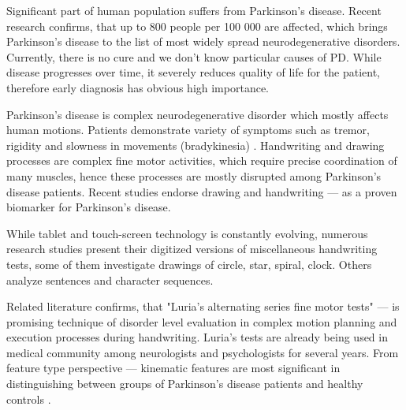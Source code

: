 \begin{comment}



\end{comment}


Significant part of human population suffers from  Parkinson's disease. Recent research confirms, that up to 800 people per 100 000 are affected, which brings Parkinson's disease to the list of most widely spread neurodegenerative disorders. Currently, there is no cure and we don't know particular causes of PD. While disease progresses over time, it severely reduces quality of life for the patient, therefore early diagnosis has obvious high importance. 

Parkinson's disease is complex neurodegenerative disorder which mostly affects human motions. Patients demonstrate variety of symptoms such as tremor, rigidity and slowness in movements (bradykinesia) \cite{moustafa2016motor, smits2014standardized, shukla2012micrographia, drotar2016evaluation}. Handwriting and drawing processes are complex fine motor activities, which require precise coordination of many muscles, hence these processes are mostly disrupted among Parkinson's disease patients. Recent studies \cite{nackaerts2017validity, letanneux2014micrographia, drotar2015decision} endorse drawing and handwriting --- as a proven biomarker for Parkinson's disease. 

While tablet and touch-screen technology is constantly evolving, numerous research studies present their digitized versions of miscellaneous handwriting tests, some of them investigate drawings of circle, star, spiral, clock. Others analyze sentences and character sequences.

Related literature \cite{golden1978diagnostic, nomm2016quantitative} confirms, that "Luria's alternating series fine motor tests" --- is promising technique of disorder level evaluation in complex motion planning and execution processes during handwriting. Luria's tests are already being used in medical community among neurologists and psychologists for several years. From feature type perspective --- kinematic features are most significant in distinguishing between groups of Parkinson's disease patients and healthy controls \cite{pinto2015handwriting, drotar2016evaluation, drotar2015decision}.

